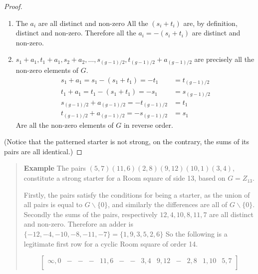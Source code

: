 \documentclass[
  11pt,
  a4paper]{book}
\newcounter{examplecounter}
\begin{document}
\begin{proof}
\begin{enumerate}
  \item{The $a_i$ are all distinct and non-zero
    All the $(s_i + t_i)$ are, by definition, distinct
    and non-zero. Therefore all the $a_i = -(s_i + t_i)$ are
    distinct and non-zero.}
  \item{$s_1 + a_1, t_1 + a_1, s_2 + a_2, \ldots, s_{(g - 1)/2}, t_{(g - 1)/2} + a_{(g - 1)/2}$
    are precisely all the non-zero elements of $G$.
    \begin{align*}
      s_1 + a_1 = s_1 - (s_1 + t_1) = -t_1 &= t_{(g - 1)/2}  \\
      t_1 + a_1 = t_1 - (s_1 + t_1) = -s_1 &= s_{(g - 1)/2}  \\
      s_{(g - 1)/2} + a_{(g - 1)/2} = -t_{(g - 1)/2} &= t_1  \\
      t_{(g - 1)/2} + a_{(g - 1)/2} = -s_{(g - 1)/2} &= s_1 
    \end{align*} }
      Are all the non-zero elements of $G$ in reverse order.
\end{enumerate}
(Notice that the patterned starter is not strong, on the
contrary, the sums of its pairs are all identical.)
\end{proof}

\begin{quote}  \textbf{Example } \quad 
The pairs $(5, 7)(11, 6)(2, 8)(9, 12)(10, 1)(3, 4)$,
constitute a strong starter for a Room square of side 13,
based on $G = Z_{13}$.

Firstly, the pairs satisfy the conditions for being a
starter, as the union of all pairs is equal to
$G \backslash \{0\}$, and similarly the differences are all of
$G\backslash \{0\}$.
Secondly the sums of the pairs,
respectively $12, 4, 10, 8, 11, 7$ are all distinct and
non-zero.
Therefore an adder is
$\{-12, -4, -10, -8, -11, -7\} = \{1, 9, 3, 5, 2, 6\}$
So the following is a legitimate first row for a cyclic
Room square of order 14.

\begin{equation}
  \begin{bmatrix}
    \infty, 0 & - & - & - & 11,6 & - & - & 3,4 & 9,12 & - & 2,8 & 1,10 & 5,7 \\
  \end{bmatrix}
\end{equation}

 \end{quote}
\end{document}
